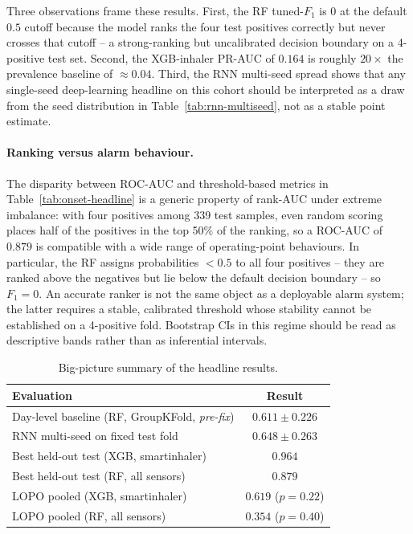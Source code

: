 \documentclass[11pt,a4paper]{article}
\newcommand{\rocauc}{ROC\nobreakdash-AUC}
\newcommand{\prauc}{PR\nobreakdash-AUC}
\begin{document}
Three observations frame these results.  First, the RF tuned-$F_1$
is $0$ at the default $0.5$ cutoff because the model ranks the four
test positives correctly but never crosses that cutoff -- a
strong-ranking but uncalibrated decision boundary on a 4-positive
test set.  Second, the XGB-inhaler \prauc{} of $0.164$ is roughly
$20\times$ the prevalence baseline of $\approx 0.04$.  Third, the
RNN multi-seed spread shows that any single-seed deep-learning
headline on this cohort should be interpreted as a draw from the
seed distribution in Table~\ref{tab:rnn-multiseed}, not as a stable
point estimate.

\paragraph{Ranking versus alarm behaviour.}
The disparity between \rocauc{} and threshold-based metrics in
Table~\ref{tab:onset-headline} is a generic property of
rank-AUC under extreme imbalance: with four positives among 339
test samples, even random scoring places half of the positives in
the top 50\% of the ranking, so a \rocauc{} of $0.879$ is
compatible with a wide range of operating-point behaviours.  In
particular, the RF assigns probabilities $<0.5$ to all four
positives -- they are ranked above the negatives but lie below the
default decision boundary -- so $F_1=0$.  An accurate ranker is
not the same object as a deployable alarm system; the latter
requires a stable, calibrated threshold whose stability cannot be
established on a 4-positive fold.  Bootstrap CIs in this regime
should be read as descriptive bands rather than as inferential
intervals.

\begin{table}[H]
\centering
\caption{Big-picture summary of the headline results.}
\label{tab:summary}
\small
\begin{tabular}{lc}
\toprule
\textbf{Evaluation} & \textbf{Result} \\
\midrule
Day-level baseline (RF, GroupKFold, \emph{pre-fix}) & $0.611 \pm 0.226$ \\
RNN multi-seed on fixed test fold          & $0.648 \pm 0.263$ \\
Best held-out test (XGB, smartinhaler)     & $0.964$ \\
Best held-out test (RF, all sensors)       & $0.879$ \\
LOPO pooled (XGB, smartinhaler)            & $0.619$ ($p=0.22$) \\
LOPO pooled (RF, all sensors)              & $0.354$ ($p=0.40$) \\
\bottomrule
\end{tabular}
\end{table}
\end{document}
